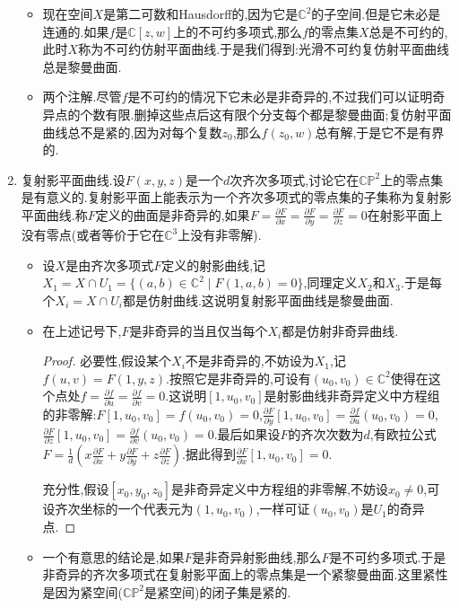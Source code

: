 \begin{enumerate}
\begin{itemize}
		\item 现在空间$X$是第二可数和Hausdorff的,因为它是$\mathbb{C}^2$的子空间.但是它未必是连通的.如果$f$是$\mathbb{C}[z,w]$上的不可约多项式,那么$f$的零点集$X$总是不可约的,此时$X$称为不可约仿射平面曲线.于是我们得到:光滑不可约复仿射平面曲线总是黎曼曲面.
		\item 两个注解.尽管$f$是不可约的情况下它未必是非奇异的,不过我们可以证明奇异点的个数有限.删掉这些点后这有限个分支每个都是黎曼曲面;复仿射平面曲线总不是紧的,因为对每个复数$z_0$,那么$f(z_0,w)$总有解,于是它不是有界的.
	\end{itemize}
    \item 复射影平面曲线.设$F(x,y,z)$是一个$d$次齐次多项式,讨论它在$\mathbb{CP}^2$上的零点集是有意义的.复射影平面上能表示为一个齐次多项式的零点集的子集称为复射影平面曲线.称$F$定义的曲面是非奇异的,如果$F=\frac{\partial F}{\partial x}=\frac{\partial F}{\partial y}=\frac{\partial F}{\partial z}=0$在射影平面上没有零点(或者等价于它在$\mathbb{C}^3$上没有非零解).
    \begin{itemize}
    	\item 设$X$是由齐次多项式$F$定义的射影曲线,记$X_1=X\cap U_1=\{(a,b)\in\mathbb{C}^2\mid F(1,a,b)=0\}$,同理定义$X_2$和$X_3$.于是每个$X_i=X\cap U_i$都是仿射曲线.这说明复射影平面曲线是黎曼曲面.
    	\item 在上述记号下,$F$是非奇异的当且仅当每个$X_i$都是仿射非奇异曲线.
    	\begin{proof}
    		
    		必要性,假设某个$X_i$不是非奇异的,不妨设为$X_1$,记$f(u,v)=F(1,y,z)$.按照它是非奇异的,可设有$(u_0,v_0)\in\mathbb{C}^2$使得在这个点处$f=\frac{\partial f}{\partial u}=\frac{\partial f}{\partial v}=0$.这说明$[1,u_0,v_0]$是射影曲线非奇异定义中方程组的非零解:$F[1,u_0,v_0]=f(u_0,v_0)=0$,$\frac{\partial F}{\partial y}[1,u_0,v_0]=\frac{\partial f}{\partial u}(u_0,v_0)=0$,$\frac{\partial F}{\partial z}[1,u_0,v_0]=\frac{\partial f}{\partial v}(u_0,v_0)=0$.最后如果设$F$的齐次次数为$d$,有欧拉公式$F=\frac{1}{d}\left(x\frac{\partial F}{\partial x}+y\frac{\partial F}{\partial y}+z\frac{\partial F}{\partial z}\right)$.据此得到$\frac{\partial F}{\partial x}[1,u_0,v_0]=0$.
    		
    		充分性,假设$[x_0,y_0,z_0]$是非奇异定义中方程组的非零解,不妨设$x_0\not=0$,可设齐次坐标的一个代表元为$(1,u_0,v_0)$,一样可证$(u_0,v_0)$是$U_1$的奇异点.
    	\end{proof}
    	\item 一个有意思的结论是,如果$F$是非奇异射影曲线,那么$F$是不可约多项式.于是非奇异的齐次多项式在复射影平面上的零点集是一个紧黎曼曲面.这里紧性是因为紧空间($\mathbb{CP}^2$是紧空间)的闭子集是紧的.
    \end{itemize}
\end{enumerate}

